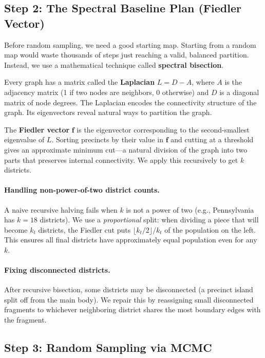 \documentclass[11pt]{article}
\begin{document}
\subsection{Step 2: The Spectral Baseline Plan (Fiedler Vector)}

Before random sampling, we need a good starting map. Starting from a
random map would waste thousands of steps just reaching a valid,
balanced partition. Instead, we use a mathematical technique called
\textbf{spectral bisection}.

Every graph has a matrix called the \textbf{Laplacian} $L = D - A$,
where $A$ is the adjacency matrix (1 if two nodes are neighbors, 0
otherwise) and $D$ is a diagonal matrix of node degrees. The Laplacian
encodes the connectivity structure of the graph. Its eigenvectors
reveal natural ways to partition the graph.

The \textbf{Fiedler vector} $\mathbf{f}$ is the eigenvector
corresponding to the second-smallest eigenvalue of $L$. Sorting
precincts by their value in $\mathbf{f}$ and cutting at a threshold
gives an approximate minimum cut---a natural division of the graph into
two parts that preserves internal connectivity. We apply this
recursively to get $k$ districts.

\paragraph{Handling non-power-of-two district counts.} A naive
recursive halving fails when $k$ is not a power of two (e.g.,
Pennsylvania has $k = 18$ districts). We use a \emph{proportional}
split: when dividing a piece that will become $k_t$ districts, the
Fiedler cut puts $\lfloor k_t/2\rfloor / k_t$ of the population on the
left. This ensures all final districts have approximately equal
population even for any $k$.

\paragraph{Fixing disconnected districts.} After recursive bisection,
some districts may be disconnected (a precinct island split off from the
main body). We repair this by reassigning small disconnected fragments
to whichever neighboring district shares the most boundary edges with
the fragment.

\subsection{Step 3: Random Sampling via MCMC}
\end{document}
